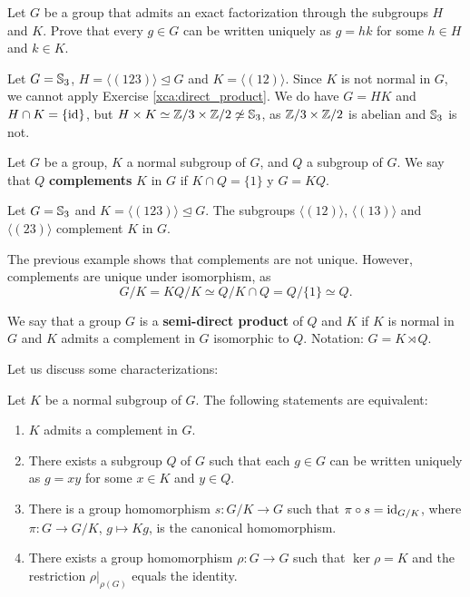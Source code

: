 \begin{exercise}
    Let $G$ be a group that admits an exact factorization through
    the subgroups $H$ and $K$. Prove that every $g\in G$ can be written 
    uniquely as $g=hk$ for some $h\in H$ and $k\in K$. 
\end{exercise}

\begin{example}
Let $G=\mathbb{S}_3$, $H=\langle (123)\rangle\unlhd G$ and $K=\langle (12)\rangle$. Since
$K$ is not normal in $G$, we cannot apply Exercise \ref{xca:direct_product}. 
We do have $G=HK$ and $H\cap K=\{\operatorname{id}\}$, but $H\times K\simeq\mathbb{Z}/3\times\mathbb{Z}/2\not\simeq\mathbb{S}_3$, 
as $\mathbb{Z}/3\times\mathbb{Z}/2$ is abelian and $\mathbb{S}_3$ is not. 
\end{example}


\begin{definition}
Let $G$ be a group, $K$ a normal subgroup of $G$, and $Q$ a subgroup of $G$. We say
that $Q$ \textbf{complements} $K$ in $G$ if $K\cap Q=\{1\}$ y $G=KQ$.
\end{definition}

\begin{example}
Let $G=\mathbb{S}_3$ and $K=\langle (123)\rangle\unlhd G$. The subgroups
$\langle (12)\rangle$, $\langle
(13)\rangle$ and $\langle (23)\rangle$ complement $K$ in $G$.
\end{example}

The previous example shows that complements are not unique. However, 
complements are unique under isomorphism, as 
\[
G/K= KQ/K\simeq Q/K\cap Q=Q/\{1\}\simeq Q.
\]

\begin{definition}
We say that a group $G$ is a \textbf{semi-direct product} of $Q$ and $K$ if $K$ 
is normal in $G$ and 
$K$ admits a complement in $G$ isomorphic to $Q$. Notation: $G=K\rtimes Q$.
\end{definition}

Let us discuss some characterizations:

\begin{proposition}
Let $K$ be a normal subgroup of $G$. The following statements are equivalent:
\begin{enumerate}
\item $K$ admits a complement in $G$.
\item There exists a subgroup $Q$ of $G$ such that each $g\in G$ can be written uniquely 
as $g=xy$ for some 
$x\in K$ and $y\in Q$.
\item There is a group homomorphism $s\colon G/K\to G$ such that $\pi\circ s=\operatorname{id}_{G/K}$, where $\pi\colon G\to G/K
$, $g\mapsto Kg$, is the canonical homomorphism.
\item There exists a group homomorphism $\rho\colon G\to G$ such that $\ker\rho=K$ and the restriction $\rho|_{\rho(G)}$ equals the identity. 
\end{enumerate}
\end{proposition}

